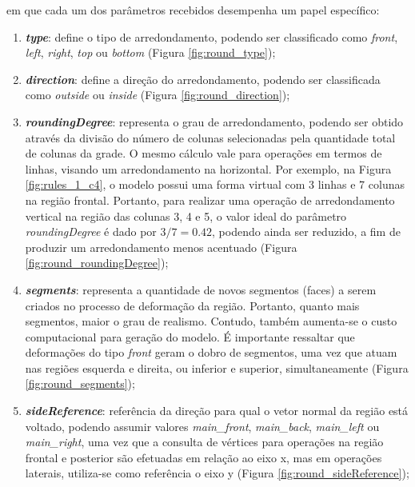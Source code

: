 \noindent em que cada um dos parâmetros recebidos desempenha um papel específico:

\vspace{0.3cm}

\begin{enumerate}
    \item \label{itm:type} \textbf{\textit{type}}: define o tipo de arredondamento, podendo ser classificado como \textit{front}, \textit{left}, \textit{right}, \textit{top} ou \textit{bottom} (Figura \ref{fig:round_type});
    
    \item \label{itm:direction} \textbf{\textit{direction}}: define a direção do arredondamento, podendo ser classificada como \textit{outside} ou \textit{inside} (Figura \ref{fig:round_direction});
    
    \item \label{itm:roundingDegree} \textbf{\textit{roundingDegree}}: representa o grau de arredondamento, podendo ser obtido através da divisão do número de colunas selecionadas pela quantidade total de colunas da grade. O mesmo cálculo vale para operações em termos de linhas, visando um arredondamento na horizontal. Por exemplo, na Figura \ref{fig:rules_1_c4}, o modelo possui uma forma virtual com 3 linhas e 7 colunas na região frontal. Portanto, para realizar uma operação de arredondamento vertical na região das colunas 3, 4 e 5, o valor ideal do parâmetro \textit{roundingDegree} é dado por $3/7=0.42$, podendo ainda ser reduzido, a fim de produzir um arredondamento menos acentuado (Figura \ref{fig:round_roundingDegree});
    
    \item \label{itm:segments} \textbf{\textit{segments}}: representa a quantidade de novos segmentos (faces) a serem criados no processo de deformação da região. Portanto, quanto mais segmentos, maior o grau de realismo. Contudo, também aumenta-se o custo computacional para geração do modelo. É importante ressaltar que deformações do tipo \textit{front} geram o dobro de segmentos, uma vez que atuam nas regiões esquerda e direita, ou inferior e superior, simultaneamente (Figura \ref{fig:round_segments});
    
    \item \label{itm:sideReference} \textbf{\textit{sideReference}}: referência da direção para qual o vetor normal da região está voltado, podendo assumir valores \textit{main\_front}, \textit{main\_back}, \textit{main\_left} ou \textit{main\_right}, uma vez que a consulta de vértices para operações na região frontal e posterior são efetuadas em relação ao eixo x, mas em operações laterais, utiliza-se como referência o eixo y (Figura \ref{fig:round_sideReference});
    

\end{enumerate}
